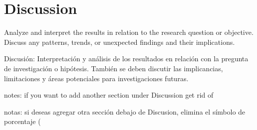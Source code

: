 \section{Discussion}

Analyze and interpret the results in relation to the research question or objective. Discuss any patterns, trends, or unexpected findings and their implications.

Discusión: Interpretación y análisis de los resultados en relación con la pregunta de investigación o hipótesis. También se deben discutir las implicancias, limitaciones y áreas potenciales para investigaciones futuras. 

notes: if you want to add another section under Discussion get rid of %

notas: si deseas agregar otra sección debajo de Discusion, elimina el símbolo de porcentaje (%

